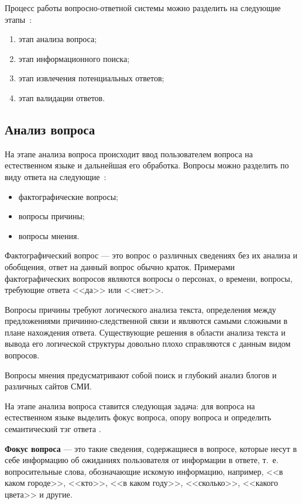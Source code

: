 Процесс работы вопросно-ответной системы можно разделить на следующие этапы~\cite{step21}: 
\begin{enumerate}
	\item этап анализа вопроса;
	\item этап информационного поиска;
	\item этап извлечения потенциальных ответов;
	\item этап валидации ответов.
\end{enumerate}

\subsection{Анализ вопроса}

На этапе анализа вопроса происходит ввод пользователем вопроса на естественном языке и дальнейшая его обработка. Вопросы можно разделить по виду ответа на следующие~\cite{all}: 
\begin{itemize}[label=---]
	\item фактографические вопросы;
	\item вопросы причины; 
	\item вопросы мнения. 
\end{itemize}

Фактографический вопрос --- это вопрос о различных сведениях без их анализа и обобщения,  ответ на данный вопрос обычно краток. Примерами фактографических вопросов являются вопросы о персонах, о времени, вопросы, требующие ответа <<да>> или <<нет>>.

Вопросы причины требуют логического анализа текста, определения между предложениями причинно-следственной связи и являются самыми сложными в плане нахождения ответа. Существующие решения в области анализа текста и вывода его логической структуры довольно плохо справляются с данным видом вопросов. 

Вопросы мнения предусматривают собой поиск и глубокий анализ блогов и различных сайтов СМИ.

На этапе анализа вопроса ставится следующая задача: для вопроса на естественном языке выделить фокус вопроса, опору вопроса и определить семантический тэг ответа \cite{step1}.

\textbf{Фокус вопроса} --- это такие сведения, содержащиеся в вопросе, которые несут в себе информацию об ожиданиях пользователя от информации в ответе, т.~е. вопросительные слова,
обозначающие искомую информацию, например, <<в каком городе>>, <<кто>>, <<в каком году>>,  <<сколько>>,  <<какого цвета>> и другие.

